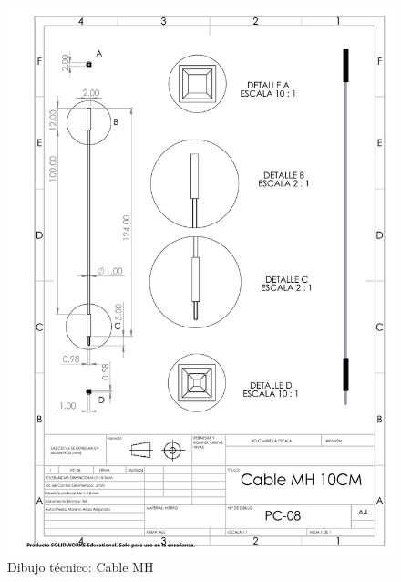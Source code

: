 \begin{figure}[H]
    \centering
    \includegraphics[trim = {7mm 1mm 1mm 1mm},clip,scale=0.4]{22/img/cableMHDibujo.PDF}
    \caption{Dibujo técnico: Cable MH}
    \label{fig:enter-label8}
\end{figure}


